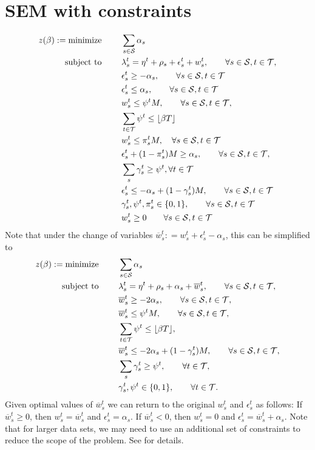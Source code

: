 \documentclass[11pt, letterpaper,nounbold]{article}
\renewcommand{\S}{\mathcal{S}}
\newcommand{\T}{\mathcal{T}}
\begin{document}
\section{SEM with constraints}
\begin{align*}
z(\beta) : = \text{minimize \qquad } &\sum_{s\in \S} \alpha_{s}\\
	\text{subject to \qquad} &\lambda_{s}^{t} = \eta^{t} + \rho_{s} + \epsilon_{s}^{t} + w_{s}^{t},\qquad \forall s \in \S, t \in \T,\\
		& \epsilon_{s}^{t} \geq -\alpha_{s},\qquad \forall s\in \S, t \in \T\\
		& \epsilon_{s}^{t} \leq \alpha_{s},\qquad \forall s\in \S, t\in \T\\
		& w_{s}^{t} \leq \psi^{t}M, \qquad \forall s\in \S, t \in \T,\\
		&\sum_{t\in \T} \psi^{t} \leq \lfloor \beta T\rfloor\\
		&w_{s}^{t} \leq \pi_{s}^{t} M, \quad \forall s\in \S, t \in \T\\
		&\epsilon_{s}^{t} + (1-\pi_{s}^{t})M \geq \alpha_{s}, \qquad \forall s\in \S, t\in \T,\\
		&\sum_{s}\gamma_{s}^{t} \geq \psi^{t}, \forall t\in \T\\
		&\epsilon_{s}^{t} \leq -\alpha_{s} + (1-\gamma_{s}^{t})M, \qquad \forall s\in \S, t\in \T\\
		&\gamma_{s}^{t}, \psi^{t}, \pi_{s}^{t}\in \{0, 1\}, \qquad \forall s\in \S,t\in \T\\
		&w_{s}^{t} \geq 0 \qquad \forall s\in \S, t\in \T
\end{align*}
Note that under the change of variables $\overline{w}_{s}^{t}: = w_{s}^{t} + \epsilon_{s}^{t} - \alpha_{s}$, this can be simplified to
\begin{align*}
z(\beta) : = \text{minimize \qquad } &\sum_{s\in \S} \alpha_{s}\\
	\text{subject to \qquad} &\lambda_{s}^{t} = \eta^{t} + \rho_{s} + \alpha_{s} + \overline{w}_{s}^{t},\qquad \forall s \in \S, t \in \T,\\
		& \overline{w}_{s}^{t} \geq -2\alpha_{s},\qquad \forall s\in \S, t \in \T,\\
		& \overline{w}_{s}^{t} \leq \psi^{t} M,\qquad \forall s\in \S, t\in \T,\\
		&\sum_{t\in \T} \psi^{t} \leq \lfloor \beta T\rfloor,\\
		&\overline{w}_{s}^{t} \leq -2\alpha_{s} + (1-\gamma_{s}^{t})M, \qquad \forall s \in \S, t\in \T,\\
		&\sum_{s}\gamma_{s}^{t} \geq \psi^{t},\qquad \forall t\in \T,\\
		&\gamma_{s}^{t}, \psi^{t} \in \{0,1\}, \qquad \forall t\in \T.
\end{align*}
Given optimal values of $\overline{w}_{s}^{t}$ we can return to the original $w_{s}^{t}$ and $\epsilon_{s}^{t}$ as follows: If $\overline{w}_{s}^{t} \geq 0$, then $w_{s}^{t} = \overline{w}_{s}^{t}$ and $\epsilon_{s}^{t} = \alpha_{s}$. If $\overline{w}_{s}^{t} < 0$, then $w_{s}^{t} = 0$ and $\epsilon_{s}^{t} = \overline{w}_{s}^{t} + \alpha_{s}$. Note that for larger data sets, we may need to use an additional set of constraints to reduce the scope of the problem. See \cite[pp.~23--24]{Zhu2020} for details.
\end{document}
